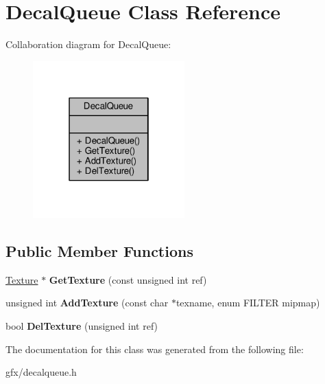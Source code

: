 \hypertarget{classDecalQueue}{}\section{Decal\+Queue Class Reference}
\label{classDecalQueue}


Collaboration diagram for Decal\+Queue\+:
\nopagebreak
\begin{figure}[H]
\begin{center}
\leavevmode
\includegraphics[width=166pt]{d7/d57/classDecalQueue__coll__graph}
\end{center}
\end{figure}
\subsection*{Public Member Functions}
\begin{DoxyCompactItemize}
\item 
\hyperlink{classTexture}{Texture} $\ast$ {\bfseries Get\+Texture} (const unsigned int ref)\hypertarget{classDecalQueue_a463abb58d025f4ecc986c601ca5f5e5b}{}\label{classDecalQueue_a463abb58d025f4ecc986c601ca5f5e5b}

\item 
unsigned int {\bfseries Add\+Texture} (const char $\ast$texname, enum F\+I\+L\+T\+ER mipmap)\hypertarget{classDecalQueue_aaac820a0030934e0fb71bf5e63b9191d}{}\label{classDecalQueue_aaac820a0030934e0fb71bf5e63b9191d}

\item 
bool {\bfseries Del\+Texture} (unsigned int ref)\hypertarget{classDecalQueue_a18edb4267b82e4ba42af97e298f03aa3}{}\label{classDecalQueue_a18edb4267b82e4ba42af97e298f03aa3}

\end{DoxyCompactItemize}


The documentation for this class was generated from the following file\+:\begin{DoxyCompactItemize}
\item 
gfx/decalqueue.\+h\end{DoxyCompactItemize}
